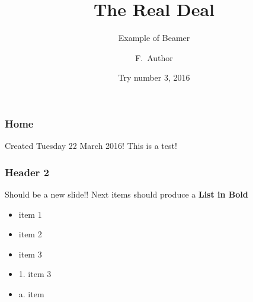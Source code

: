 \documentclass{beamer}
\begin{document}
\title[Teste Beamer]{The Real Deal}
 \subtitle{Example of Beamer}
\author[Ze Carlos]
{F.~Author  }
 \date[PT 2016]{Try number 3, 2016}
 \subject{Computer Science}

\begin{frame}
	\frametitle{Home}
Created Tuesday 22 March 2016!
This is a test!
\end{frame}

\begin{frame}
	\frametitle{Header 2}
Should be a new slide!!
Next items should produce a 
\textbf{List in Bold}

\begin{itemize}
\item item 1
\end{itemize}

\begin{itemize}
\item item 2
\end{itemize}

\begin{itemize}
\item item 3
\end{itemize}

\begin{itemize}

\begin{itemize}
\item 1. item 3
\end{itemize}
\end{itemize}

\begin{itemize}

\begin{itemize}
\item a. item
\end{itemize}
\end{itemize}
\end{frame}

\end{document}
